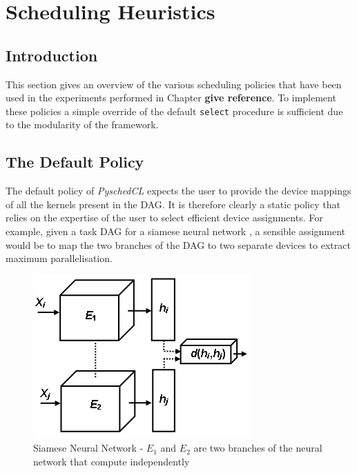 
\chapter{Scheduling Heuristics} %

\label{Chapter5} %



\section{Introduction}
This section gives an overview of the various scheduling policies that have been used in the experiments performed in Chapter \textbf{give reference}. To implement these policies a simple override of the default {\tt select} procedure is sufficient due to the modularity of the framework.

\section{The Default Policy}
The default policy of \emph{PyschedCL} expects the user to provide the device mappings of all the kernels present in the DAG. It is therefore clearly a static policy that relies on the expertise of the user to select efficient device assignments. For example, given a task DAG for a siamese neural network \cite{siamese}, a sensible assignment would be to map the two branches of the DAG to two separate devices to extract maximum parallelisation.  

\begin{figure}[H]
    \centering
    \includegraphics[scale=0.45]{Pictures/siamese.png}
    \caption{\small Siamese Neural Network - $E_{1}$ and $E_{2}$ are two branches of the neural network that compute independently\label{fig:siamese network}}
\end{figure}

